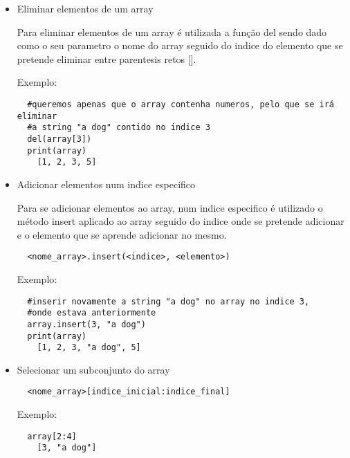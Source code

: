\documentclass{article}
\begin{document}
\begin{itemize}
\begin{itemize}
  Exemplo:
  
  \begin{lstlisting}
  #Selecionar a string "a dog" do array, sendo o seu indice 3
  print(array[3])
  	a dog
  	
  #selecionar o numero 3 do array, sendo o seu indice 2, e atribuir o mesmo à variavel num
  num = array[2]
  print(num)
  	3
  \end{lstlisting}
  
  \item Eliminar elementos de um array
  
  Para eliminar elementos de um array é utilizada a fun\c c\~ao del sendo dado como o seu parametro o nome do array seguido do indice do elemento que se pretende eliminar entre parentesis retos [].
  
  Exemplo:
  
  \begin{lstlisting}
  #queremos apenas que o array contenha numeros, pelo que se irá eliminar 
  #a string "a dog" contido no indice 3
  del(array[3])
  print(array)
  	[1, 2, 3, 5]
  \end{lstlisting}
  
  \item Adicionar elementos num indice especifico
  
  Para se adicionar elementos ao array, num indice especifico \'e utilizado o m\'etodo insert aplicado ao array seguido do indice onde se pretende adicionar e o elemento que se aprende adicionar no mesmo.
  
  \begin{lstlisting}
  <nome_array>.insert(<indice>, <elemento>)
  \end{lstlisting}
  
  Exemplo:
  
  \begin{lstlisting}
  #inserir novamente a string "a dog" no array no indice 3, 
  #onde estava anteriormente
  array.insert(3, "a dog")
  print(array)
  	[1, 2, 3, "a dog", 5]
  \end{lstlisting}
  
  \item Selecionar um subconjunto do array
  
  \begin{lstlisting}
  <nome_array>[indice_inicial:indice_final]
  \end{lstlisting}
  
  Exemplo:
  
  \begin{lstlisting}
  array[2:4]
  	[3, "a dog"]
  \end{lstlisting}
  

\end{itemize}
\end{itemize}
\end{document}
